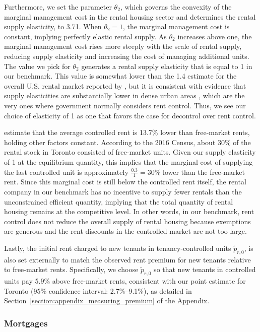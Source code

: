 \documentclass[parskip=full]{article}
\begin{document}
Furthermore, we set the parameter $\theta_2$, which governs the convexity of the marginal management cost in the rental housing sector and determines the rental supply elasticity, to 3.71. When $\theta_2=1$, the marginal management cost is constant, implying perfectly elastic rental supply. As $\theta_2$ increases above one, the marginal management cost rises more steeply with the scale of rental supply, reducing supply elasticity and increasing the cost of managing additional units. The value we pick for $\theta_2$ generates a rental supply elasticity that is equal to 1 in our benchmark. This value is somewhat lower than the 1.4 estimate for the overall U.S. rental market reported by \citet{rs-2023}, but it is consistent with evidence that supply elasticities are substantially lower in dense urban areas \citep{cy-1994,susin-2002,fack-2006,sy-2020}, which are the very ones where government normally considers rent control. Thus, we see our choice of elasticity of 1 as one that favors the case for decontrol over rent control.

\citet{zhang-gou} estimate that the average controlled rent is 13.7\% lower than free-market rents, holding other factors constant. According to the 2016 Census, about 30\% of the rental stock in Toronto consisted of free-market units. Given our supply elasticity of 1 at the equilibrium quantity, this implies that the marginal cost of supplying the last controlled unit is approximately $\frac{0.3}{1}=30\%$ lower than the free-market rent. Since this marginal cost is still below the controlled rent itself, the rental company in our benchmark has no incentive to supply fewer rentals than the unconstrained efficient quantity, implying that the total quantity of rental housing remains at the competitive level. In other words, in our benchmark, rent control does not reduce the overall supply of rental housing because exemptions are generous and the rent discounts in the controlled market are not too large.

Lastly, the initial rent charged to new tenants in tenancy-controlled units $\tilde{p}_{r,0}$, is also set externally to match the observed rent premium for new tenants relative to free-market rents. Specifically, we choose $\tilde{p}_{r,0}$ so that new tenants in controlled units pay 5.9\% above free-market rents, consistent with our point estimate for Toronto (95\% confidence interval: 2.7\%–9.1\%), as detailed in Section~\ref{section:appendix_measuring_premium} of the Appendix.

\subsubsection{Mortgages}
\end{document}
